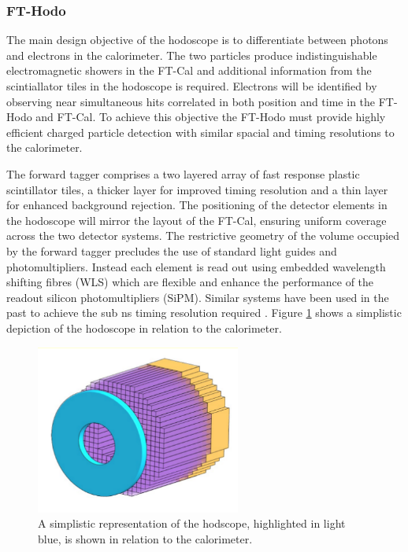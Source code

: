 \subsubsection{FT-Hodo}

The main design objective of the hodoscope is to differentiate between photons and electrons in the calorimeter. The two particles produce indistinguishable electromagnetic showers in the FT-Cal and additional information from the scintiallator tiles in the hodoscope is required. Electrons will be identified by observing near simultaneous hits correlated in both position and time in the FT-Hodo and FT-Cal. To achieve this objective the FT-Hodo must provide highly efficient charged particle detection with similar spacial and timing resolutions to the calorimeter.

The forward tagger comprises a two layered array of fast response plastic scintillator tiles, a thicker layer for improved timing resolution and a thin layer for enhanced background rejection. The positioning of the detector elements in the hodoscope will mirror the layout of the FT-Cal, ensuring uniform coverage across the two detector systems. The restrictive geometry of the volume occupied by the forward tagger precludes the use of standard light guides and photomultipliers. Instead each element is read out using embedded wavelength shifting fibres (WLS) which are flexible and enhance the performance of the readout silicon photomultipliers (SiPM). Similar systems have been used in the past to achieve the sub ns timing resolution required \cite{stepanyan2008clas}. Figure \ref{fthodo} shows a simplistic depiction of the hodoscope in relation to the calorimeter.

\begin{figure}
	\centering
	\includegraphics[width=0.6\textwidth]{ImgChap1/fthodo}
	\caption{A simplistic representation of the hodscope, highlighted in light blue, is shown in relation to the calorimeter. \cite{FTTDR2012} }
	\label{fthodo}
\end{figure}

